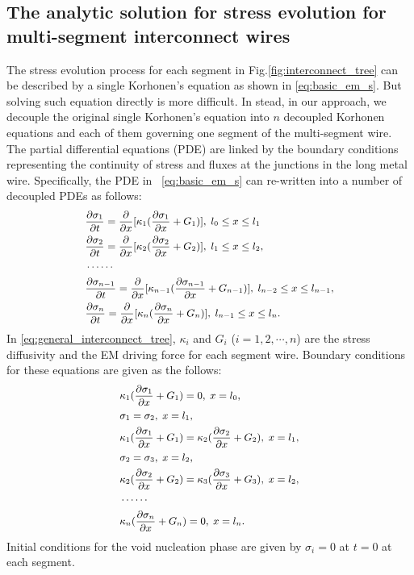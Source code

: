 \subsection{The analytic solution for stress evolution for multi-segment interconnect wires}
The stress evolution process for each segment in
Fig.\ref{fig:interconnect_tree} can be described by a single
Korhonen's equation as shown in \eqref{eq:basic_em_s}. But solving
such equation directly is more difficult.  In stead, in our approach,
we decouple the original single Korhonen's equation into $n$ decoupled
Korhonen equations and each of them governing one segment of the
multi-segment wire. The partial differential equations (PDE) are
linked by the boundary conditions representing the continuity of
stress and fluxes at the junctions in the long metal
wire. Specifically, the PDE in ~\eqref{eq:basic_em_s} can re-written
into a number of decoupled PDEs as follows:
\begin{equation} \label{eq:general_interconnect_tree}\small
\begin{split}
&\frac{\partial \sigma_1}{\partial t}=\frac{\partial }{\partial
x}[\kappa_1(\frac{\partial \sigma_1}{\partial x}+G_1)],\;l_0\leq x \leq l_1 \\
&\frac{\partial \sigma_2}{\partial t}=\frac{\partial }{\partial
x}[\kappa_2(\frac{\partial \sigma_2}{\partial
x}+G_2)],\;l_1\leq x \leq l_2, \\
&\cdots\cdots\\
&\frac{\partial \sigma_{n-1}}{\partial t}=\frac{\partial }{\partial
x}[\kappa_{n-1}(\frac{\partial \sigma_{n-1}}{\partial
x}+G_{n-1})],\;l_{n-2}\leq x \leq l_{n-1}, \\
&\frac{\partial \sigma_{n}}{\partial t}=\frac{\partial }{\partial
x}[\kappa_{n}(\frac{\partial \sigma_{n}}{\partial
x}+G_{n})],\;l_{n-1}\leq x \leq l_n.
 \end{split}
 \end{equation}
 In \eqref{eq:general_interconnect_tree}, $\kappa_{i}$ and $G_i$
 ($i=1,2,\cdots,n$) are the stress diffusivity and the EM driving
 force for each segment wire. Boundary conditions for these equations
 are given as the follows:
 \begin{equation} \label{bc:general_interconnect_tree}\small
\begin{split}
&\kappa_1(\frac{\partial \sigma_1}{\partial x}+G_1)=0,\;x=l_0,\\
&\sigma_1=\sigma_2,\;x=l_1,\\
&\kappa_1(\frac{\partial \sigma_1}{\partial
x}+G_1)=\kappa_2(\frac{\partial \sigma_2}{\partial
x}+G_2),\;x=l_1,\\
&\sigma_2=\sigma_3,\;x=l_2,\\
&\kappa_2(\frac{\partial \sigma_2}{\partial
x}+G_2)=\kappa_3(\frac{\partial \sigma_3}{\partial
x}+G_3),\;x=l_2,\\
&\cdots\cdots \\
&\kappa_n(\frac{\partial \sigma_n}{\partial
x}+G_n)=0,\;x=l_n.
 \end{split}
 \end{equation}
 Initial conditions for the void nucleation phase are given by
 $\sigma_i=0$ at $t=0$ at each segment.

